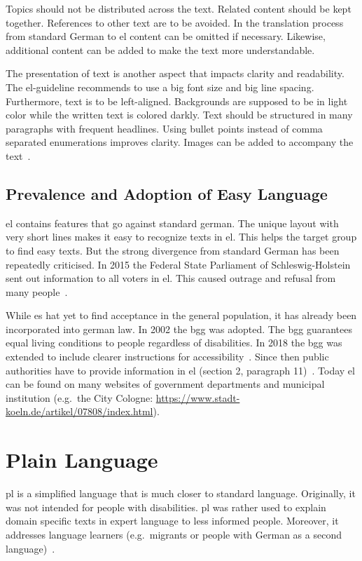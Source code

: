 Topics should not be distributed across the text.
Related content should be kept together.
References to other text are to be avoided.
In the translation process from standard German to \gls{el} content can be omitted if necessary.
Likewise, additional content can be added to make the text more understandable.

The presentation of text is another aspect that impacts clarity and readability.
The \gls{el}-guideline recommends to use a big font size and big line spacing.
Furthermore, text is to be left-aligned.
Backgrounds are supposed to be in light color while the written text is colored darkly.
Text should be structured in many paragraphs with frequent headlines.
Using bullet points instead of comma separated enumerations improves clarity.
Images can be added to accompany the text~\autocite{netzwerkLS}.

\subsection{Prevalence and Adoption of Easy Language}\label{subsec:el-adop}

\gls{el} contains features that go against standard german.
The unique layout with very short lines makes it easy to recognize texts in \gls{el}.
This helps the target group to find easy texts.
But the strong divergence from standard German has been repeatedly criticised.
In 2015 the Federal State Parliament of Schleswig-Holstein sent out information to all voters in \gls{el}.
This caused outrage and refusal from many people~\autocite{easyLanguageBook}.

While \gls{es} hat yet to find acceptance in the general population, it has already been incorporated into german law.
In 2002 the \gls{bgg} was adopted.
The \gls{bgg} guarantees equal living conditions to people regardless of disabilities.
In 2018 the \gls{bgg} was extended to include clearer instructions for accessibility~\autocite{bggInfo}.
Since then public authorities have to provide information in \gls{el} (section 2, paragraph 11)~\autocite{bgg2018}.
Today \gls{el} can be found on many websites of government departments and municipal institution (e.g.\ the City Cologne: \url{https://www.stadt-koeln.de/artikel/07808/index.html}).

\section{Plain Language}\label{sec:pl}
\gls{pl} is a simplified language that is much closer to standard language.
Originally, it was not intended for people with disabilities.
\gls{pl} was rather used to explain domain specific texts in expert language to less informed people.
Moreover, it addresses language learners (e.g.\ migrants or people with German as a second language)~\autocite{easyLanguageBook}.

